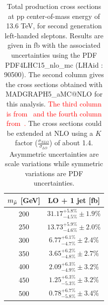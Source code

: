 \documentclass{cernatlasnote}
\begin{document}
\begin{appendices}
\begin{table}
    \centering
    \caption{Total production cross sections at pp center-of-mass  energy of 13.6 TeV, for second generation left-handed sleptons. Results are given in fb with the associated uncertainties using the PDF PDF4LHC15\_nlo\_mc (LHAid : 90500). The second column gives the cross sections obtained with MADGRAPH5\_aMC@NLO for this analysis. \textcolor{red}{The third column is from~\cite{Fuks_2014} and the fourth column from~\cite{Fiaschi_2018}.} The cross sections could be extended at NLO using a $K$ factor ($\frac{\sigma_{NLO}}{\sigma_{LO}}$) of about 1.4. Asymmetric uncertainties are scale variations while symmetric variations are PDF uncertainties.} 
    \label{tab:LEFTXS13p6}
    \smallskip
    \begin{tabular}{ cc }
         $m_{\Tilde{\mu}}$ [GeV]  & LO + 1 jet [fb] \\
         \hline
         200  & $31.17^{+5.8\%}_{-4.5\%} \pm 1.9\%$  \\
         250  & $13.73^{+5.9\%}_{-4.6\%} \pm 2.0\%$   \\
         300  & $6.77^{+6.1\%}_{-4.7\%} \pm 2.4\%$ \\
         350  & $3.65^{+6.2\%}_{-4.8\%} \pm 2.7\%$ \\
         400  & $2.09^{+6.3\%}_{-4.9\%} \pm 3.2\%$ \\
         450  & $1.25^{+6.3\%}_{-5.3\%} \pm 3.2\%$  \\
         500  & $0.78^{+6.7\%}_{-5.8\%} \pm 3.4\%$  \\
    \end{tabular}
\end{table}


\end{appendices}
\end{document}
